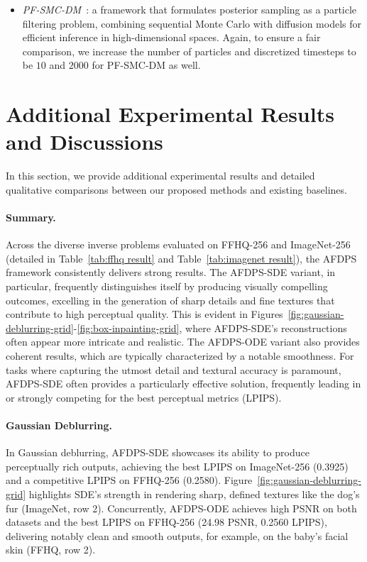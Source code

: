 \documentclass{article}
\numberwithin{equation}{section}
\begin{document}
\begin{itemize}
    \item \emph{PF-SMC-DM~\cite{dou2024diffusion}}: a framework that formulates posterior sampling as a particle filtering problem, combining sequential Monte Carlo with diffusion models for efficient inference in high-dimensional spaces. Again, to ensure a fair comparison, we increase the number of particles and discretized timesteps to be $10$ and $2000$ for PF-SMC-DM as well. 
    
\end{itemize}

\section{Additional Experimental Results and Discussions}
\label{sec: experiment results detail app}


In this section, we provide additional experimental results and detailed qualitative comparisons between our proposed methods and existing baselines.



\paragraph{Summary.}

Across the diverse inverse problems evaluated on FFHQ-256 and ImageNet-256 (detailed in Table~\ref{tab:ffhq result} and Table~\ref{tab:imagenet result}), the AFDPS framework consistently delivers strong results. The AFDPS-SDE variant, in particular, frequently distinguishes itself by producing visually compelling outcomes, excelling in the generation of sharp details and fine textures that contribute to high perceptual quality. This is evident in Figures~\ref{fig:gaussian-deblurring-grid}-\ref{fig:box-inpainting-grid}, where AFDPS-SDE's reconstructions often appear more intricate and realistic. The AFDPS-ODE variant also provides coherent results, which are typically characterized by a notable smoothness. For tasks where capturing the utmost detail and textural accuracy is paramount, AFDPS-SDE often provides a particularly effective solution, frequently leading in or strongly competing for the best perceptual metrics (LPIPS).

\paragraph{Gaussian Deblurring.}
In Gaussian deblurring, AFDPS-SDE showcases its ability to produce perceptually rich outputs, achieving the best LPIPS on ImageNet-256 (0.3925) and a competitive LPIPS on FFHQ-256 (0.2580). Figure~\ref{fig:gaussian-deblurring-grid} highlights SDE's strength in rendering sharp, defined textures like the dog's fur (ImageNet, row 2). Concurrently, AFDPS-ODE achieves high PSNR on both datasets and the best LPIPS on FFHQ-256 (24.98 PSNR, 0.2560 LPIPS), delivering notably clean and smooth outputs, for example, on the baby's facial skin (FFHQ, row 2).
\end{document}
